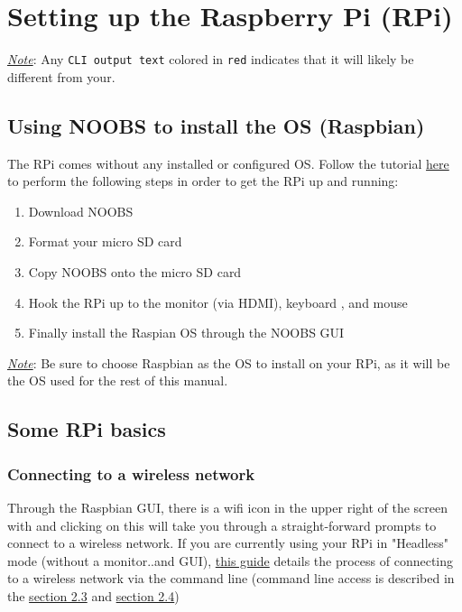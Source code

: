 \documentclass{article}
\newcommand{\outputi}[1]{\colorbox{light-gray}{\texttt{#1}}} %
\newcommand{\red}[1]{\textcolor{BrickRed}{#1}} %
\begin{document}
\section{Setting up the Raspberry Pi (RPi)}
\underline{\textit{Note}}: Any \outputi{CLI output text} colored in \outputi{\red{red}} indicates that it will likely be different from your.
  \subsection{Using NOOBS to install the OS (Raspbian)}
  The RPi comes without any installed or configured OS. Follow the tutorial \href{https://www.raspberrypi.org/help/noobs-setup/}{here} to perform the following steps in order to get the RPi up and running:
  \begin{enumerate}
    \item Download NOOBS
    \item Format your micro SD card
    \item Copy NOOBS onto the micro SD card
    \item Hook the RPi up to the monitor (via HDMI), keyboard , and mouse
    \item Finally install the Raspian OS through the NOOBS GUI
  \end{enumerate}
  \underline{\textit{Note}}: Be sure to choose Raspbian as the OS to install on your RPi, as it will be the OS used for the rest of this manual.

  \subsection{Some RPi basics}
    \subsubsection{Connecting to a wireless network}
    Through the Raspbian GUI, there is a wifi icon in the upper right of the screen with and clicking on this will take you through a straight-forward prompts to connect to a wireless network. If you are currently using your RPi in "Headless" mode (without a monitor..and GUI), \href{https://www.raspberrypi.org/documentation/configuration/wireless/wireless-cli.md}{this guide} details the process of connecting to a wireless network via the command line (command line access is described in the \hyperref[sec:connect-serial]{section 2.3} and \hyperref[sec:connect-ssh]{section 2.4})
\end{document}
